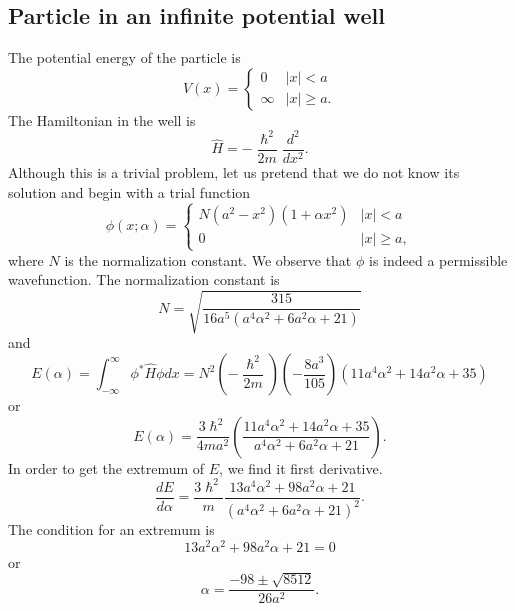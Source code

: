 \documentclass{article}
\numberwithin{equation}{section}
\begin{document}
\subsection{Particle in an infinite potential well}
The potential energy of the particle is
\begin{equation}\label{s5e12}
V(x) = \begin{cases}
0 & |x| < a \\
\infty & |x| \ge a.
\end{cases}
\end{equation}
The Hamiltonian in the well is
\begin{equation}\label{s5e13}
\hat{H} = -\frac{\hslash^2}{2m}\frac{d^2}{dx^2}.
\end{equation}
Although this is a trivial problem, let us pretend that we do not know
its solution and begin with a trial function
\begin{equation}\label{s5e14}
\phi(x;\alpha) = \begin{cases}
N(a^2 - x^2)(1 + \alpha x^2) & |x| < a \\
0 & |x| \ge a,
\end{cases}
\end{equation}
where $N$ is the normalization constant. We observe that $\phi$ is indeed a 
permissible wavefunction. The normalization constant is
\begin{equation}\label{s5e15}
N = \sqrt{\frac{315}{16 a^5(a^4\alpha^2 + 6a^2\alpha + 21)}}
\end{equation}
and
\begin{equation}\label{s5e16}
E(\alpha) = \int_{-\infty}^\infty \phi^\ast\hat{H}\phi dx = 
N^2 \left(-\frac{\hslash^2}{2m}\right)\left(-\frac{8a^3}{105}\right)
(11a^4\alpha^2 + 14a^2\alpha + 35)
\end{equation}
or
\begin{equation}\label{s5e17}
E(\alpha) = \frac{3\hslash^2}{4ma^2}
\left(\frac{11a^4\alpha^2+14a^2\alpha+35}{a^4\alpha^2+6a^2\alpha+21}\right).
\end{equation}
In order to get the extremum of $E$, we find it first derivative.
\begin{equation}\label{s5e18}
\frac{dE}{d\alpha} = \frac{3\hslash^2}{m}
\frac{13a^4\alpha^2 + 98 a^2\alpha + 21}{(a^4\alpha^2+6a^2\alpha+21)^2}.
\end{equation}
The condition for an extremum is
\begin{equation}\label{s5e19}
13a^2\alpha^2 + 98 a^2\alpha + 21 = 0
\end{equation}
or
\begin{equation}\label{s5e20}
\alpha = \frac{-98 \pm \sqrt{8512}}{26a^2}.
\end{equation}
\end{document}
